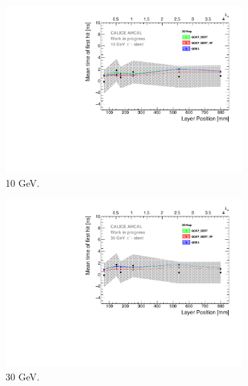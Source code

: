 \begin{figure}[htbp!]
  \begin{subfigure}[t]{0.49\textwidth}
    \centering
    \includegraphics[width=1\textwidth]{../Thesis_Plots/Timing/Pions/Plots/ComparisonToSim/Time_Depth_10GeV_DD4hep.pdf}
    \caption{10 GeV.}\label{fig:Depth_SimData_10GeV_DD4hep}
  \end{subfigure}
  \hfill
  \begin{subfigure}[t]{0.49\textwidth}
    \centering
    \includegraphics[width=1\textwidth]{../Thesis_Plots/Timing/Pions/Plots/ComparisonToSim/Time_Depth_30GeV_DD4hep.pdf}
    \caption{30 GeV.} \label{fig:Depth_SimData_30GeV_DD4hep}
  \end{subfigure}
  \hfill
  \begin{subfigure}[t]{0.49\textwidth}
    \centering

\end{subfigure}
\end{figure}
